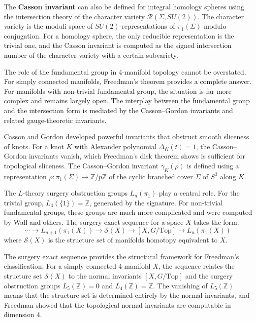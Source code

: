The \textbf{Casson invariant} can also be defined for integral homology spheres using the intersection theory of the character variety $\mathcal{R}(\Sigma, SU(2))$. The character variety is the moduli space of $SU(2)$-representations of $\pi_1(\Sigma)$ modulo conjugation. For a homology sphere, the only reducible representation is the trivial one, and the Casson invariant is computed as the signed intersection number of the character variety with a certain subvariety.

The role of the fundamental group in 4-manifold topology cannot be overstated. For simply connected manifolds, Freedman's theorem provides a complete answer. For manifolds with non-trivial fundamental group, the situation is far more complex and remains largely open. The interplay between the fundamental group and the intersection form is mediated by the Casson--Gordon invariants and related gauge-theoretic invariants.

Casson and Gordon developed powerful invariants that obstruct smooth sliceness of knots. For a knot $K$ with Alexander polynomial $\Delta_K(t) = 1$, the Casson--Gordon invariants vanish, which Freedman's disk theorem \cite{freedman1982} shows is sufficient for topological sliceness. The Casson--Gordon invariant $\gamma_K(\rho)$ is defined using a representation $\rho: \pi_1(\Sigma) \to \mathbb{Z}/p\mathbb{Z}$ of the cyclic branched cover $\Sigma$ of $S^3$ along $K$.

The $L$-theory surgery obstruction groups $L_n(\pi_1)$ play a central role. For the trivial group, $L_4(\{1\}) = \mathbb{Z}$, generated by the signature. For non-trivial fundamental groups, these groups are much more complicated and were computed by Wall and others. The surgery exact sequence for a space $X$ takes the form:
\[
\cdots \to L_{n+1}(\pi_1(X)) \to \mathcal{S}(X) \to [X, G/\text{Top}] \to L_n(\pi_1(X))
\]
where $\mathcal{S}(X)$ is the structure set of manifolds homotopy equivalent to $X$.

The surgery exact sequence provides the structural framework for Freedman's classification. For a simply connected 4-manifold $X$, the sequence relates the structure set $\mathcal{S}(X)$ to the normal invariants $[X, G/\text{Top}]$ and the surgery obstruction groups $L_5(\mathbb{Z}) = 0$ and $L_4(\mathbb{Z}) = \mathbb{Z}$. The vanishing of $L_5(\mathbb{Z})$ means that the structure set is determined entirely by the normal invariants, and Freedman showed that the topological normal invariants are computable in dimension 4.

